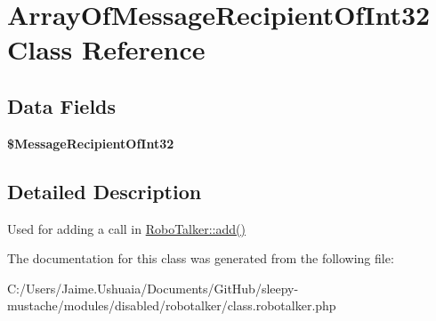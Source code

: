 \hypertarget{class_array_of_message_recipient_of_int32}{\section{Array\-Of\-Message\-Recipient\-Of\-Int32 Class Reference}
\label{class_array_of_message_recipient_of_int32}
}
\subsection*{Data Fields}
\begin{DoxyCompactItemize}
\item 
\hypertarget{class_array_of_message_recipient_of_int32_a6b5727823285f1bcb9ee8061f4fc6a49}{{\bfseries \$\-Message\-Recipient\-Of\-Int32}}\label{class_array_of_message_recipient_of_int32_a6b5727823285f1bcb9ee8061f4fc6a49}

\end{DoxyCompactItemize}


\subsection{Detailed Description}
Used for adding a call in \hyperlink{class_robo_talker_ac0650c287190d98e1d85ff9ef10a7404}{Robo\-Talker\-::add()} 

The documentation for this class was generated from the following file\-:\begin{DoxyCompactItemize}
\item 
C\-:/\-Users/\-Jaime.\-Ushuaia/\-Documents/\-Git\-Hub/sleepy-\/mustache/modules/disabled/robotalker/class.\-robotalker.\-php\end{DoxyCompactItemize}

